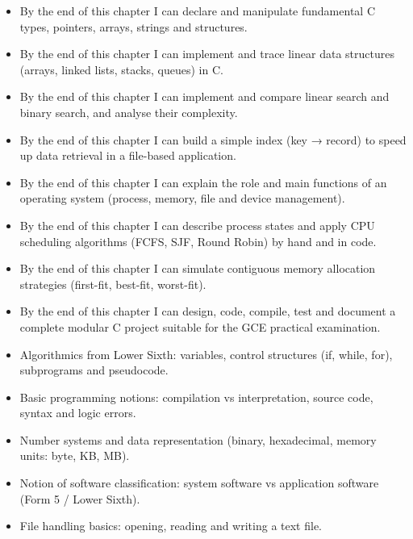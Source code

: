 \documentclass[11pt]{article}
\begin{document}
\begin{objectifs}
\begin{itemize}
\item By the end of this chapter I can declare and manipulate fundamental C types, pointers, arrays, strings and structures.
\item By the end of this chapter I can implement and trace linear data structures (arrays, linked lists, stacks, queues) in C.
\item By the end of this chapter I can implement and compare linear search and binary search, and analyse their complexity.
\item By the end of this chapter I can build a simple index (key → record) to speed up data retrieval in a file-based application.
\item By the end of this chapter I can explain the role and main functions of an operating system (process, memory, file and device management).
\item By the end of this chapter I can describe process states and apply CPU scheduling algorithms (FCFS, SJF, Round Robin) by hand and in code.
\item By the end of this chapter I can simulate contiguous memory allocation strategies (first-fit, best-fit, worst-fit).
\item By the end of this chapter I can design, code, compile, test and document a complete modular C project suitable for the GCE practical examination.
\end{itemize}
\end{objectifs}

\begin{prerequis}
\begin{itemize}
\item Algorithmics from Lower Sixth: variables, control structures (if, while, for), subprograms and pseudocode.
\item Basic programming notions: compilation vs interpretation, source code, syntax and logic errors.
\item Number systems and data representation (binary, hexadecimal, memory units: byte, KB, MB).
\item Notion of software classification: system software vs application software (Form 5 / Lower Sixth).
\item File handling basics: opening, reading and writing a text file.
\end{itemize}
\end{prerequis}
\end{document}

